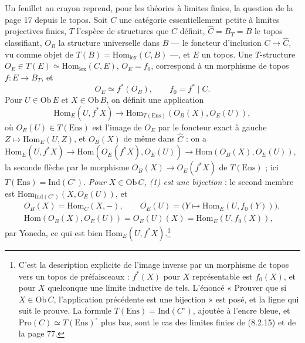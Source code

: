 \documentclass[11pt,a4paper]{article}
\begin{document}
Un feuillet au crayon reprend, pour les théories à limites finies, la
question de la page 17 depuis le topos. Soit $C$ une catégorie
essentiellement petite à limites projectives finies, $T$ l'espèce de
structures que $C$ définit, $\widehat{C} = B_{T} = B$ le topos classifiant,
$O_{B}$ la structure universelle dans $B$ — le foncteur d'inclusion $C \to
\widehat{C}$, vu comme objet de $T(B) = \mathrm{Hom}_{\mathrm{lex}}(C, B)$ —, et
$E$ un topos. Une $T$-structure $O_{E} \in T(E) \simeq \mathrm{Hom}_{
\mathrm{lex}}(C, E)$, $O_{E} = f_{0}$, correspond à un morphisme de topos $f :
E \to B_{T}$, et
\[
O_{E} \simeq f^{*}(O_{B}), \qquad f_{0} = f^{*} \mid C.
\]
Pour $U \in \mathrm{Ob}\,E$ et $X \in \mathrm{Ob}\,B$, on définit une
application
\begin{equation}
\mathrm{Hom}_{E}(U, f^{*}X) \longrightarrow \mathrm{Hom}_{T(\mathrm{Ens})}
(O_{B}(X), O_{E}(U)), \tag{1}
\end{equation}
où $O_{E}(U) \in T(\mathrm{Ens})$ est l'image de $O_{E}$ par le foncteur exact
à gauche $Z \mapsto \mathrm{Hom}_{E}(U, Z)$, et $O_{B}(X)$ de même dans
$\widehat{C}$ : on a $\mathrm{Hom}_{E}(U, f^{*}X) \to \mathrm{Hom}(O_{E}(f^{*}X),
O_{E}(U)) \to \mathrm{Hom}(O_{B}(X), O_{E}(U))$, la seconde flèche par le
morphisme $O_{B}(X) \to O_{E}(f^{*}X)$ de $T(\mathrm{Ens})$ ; ici $T(\mathrm{Ens})
= \mathrm{Ind}(C^{\circ})$. \emph{Pour $X \in \mathrm{Ob}\,C$, (1) est une
bijection} : le second membre est $\mathrm{Hom}_{\mathrm{Ind}(C^{\circ})}(X,
O_{E}(U))$, et
\begin{gather*}
O_{B}(X) = \mathrm{Hom}_{C}(X, -), \qquad O_{E}(U) = \bigl(Y \mapsto
\mathrm{Hom}_{E}(U, f_{0}(Y))\bigr), \\
\mathrm{Hom}(O_{B}(X), O_{E}(U)) = O_{E}(U)(X) = \mathrm{Hom}_{E}(U, f_{0}(X)),
\end{gather*}
par Yoneda, ce qui est bien $\mathrm{Hom}_{E}(U, f^{*}X)$.\footnote{C'est la
description explicite de l'image inverse par un morphisme de topos vers
un topos de préfaisceaux : $f^{*}(X)$ pour $X$ représentable est $f_{0}(X)$,
et pour $X$ quelconque une limite inductive de tels. L'énoncé « Prouver que
si $X \in \mathrm{Ob}\,C$, l'application précédente est une bijection » est
posé, et la ligne qui suit le prouve. La formule $T(\mathrm{Ens}) =
\mathrm{Ind}(C^{\circ})$, ajoutée à l'encre bleue, et $\mathrm{Pro}(C) \simeq
T(\mathrm{Ens})^{\circ}$ plus bas, sont le cas des limites finies de (8.2.15)
et de la page 77.}
\end{document}
